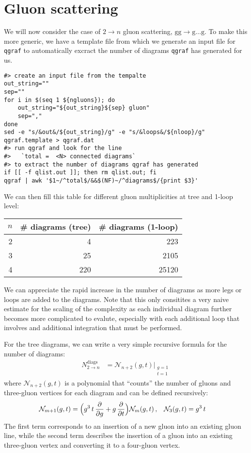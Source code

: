 \documentclass[11pt]{article}
\begin{document}
\section{Gluon scattering}
\label{sec:orga2452a0}
We will now consider the case of \(2\to n\) gluon scattering, \(\mathrm{g}\mathrm{g} \to \mathrm{g}\ldots\mathrm{g}\).
To make this more generic, we have a template file from which we generate an input file for \texttt{qgraf} to automatically excract the number of diagrams \texttt{qgraf} has generated for us.
\begin{verbatim}
#> create an input file from the tempalte
out_string=""
sep=""
for i in $(seq 1 ${ngluons}); do
    out_string="${out_string}${sep} gluon"
    sep=","
done
sed -e "s/&out&/${out_string}/g" -e "s/&loops&/${nloop}/g" qgraf.template > qgraf.dat
#> run qgraf and look for the line
#>   `total =  <N> connected diagrams`
#> to extract the number of diagrams qgraf has generated
if [[ -f qlist.out ]]; then rm qlist.out; fi
qgraf | awk '$1~/^total$/&&$(NF)~/^diagrams$/{print $3}'
\end{verbatim}
We can then fill this table for different gluon multiplicities at tree and 1-loop level:
\begin{center}
\begin{tabular}{rrr}
\(n\) & \# diagrams (tree) & \# diagrams (1-loop)\\
\hline
2 & 4 & 223\\
3 & 25 & 2105\\
4 & 220 & 25120\\
\end{tabular}
\end{center}
We can appreciate the rapid increase in the number of diagrams as more legs or loops are added to the diagrams.
Note that this only consitites a very naive estimate for the scaling of the complexity as each individual diagram further becomes more complicated to evalute, especially with each additional loop that involves and additional integration that must be performed.

For the tree diagrams, we can write a very simple recursive formula for the number of diagrams:
\begin{align}
  N_{2\to n}^\text{diags}
  &=
  \mathcal{N}_{n+2}(g,t) \bigr\rvert_{\substack{g=1\\t=1}}
\end{align}
where \(\mathcal{N}_{n+2}(g,t)\) is a polynomial that ``counts'' the number of gluons and three-gluon vertices for each diagram and can be defined recursively:
\begin{align}
  \mathcal{N}_{m+1}(g,t)
  &= \Bigl(g^3\,t\,\frac{\partial}{\partial g}
         + g\,\frac{\partial}{\partial t} \Bigr)
  \mathcal{N}_{m}(g,t) \,, &
  \mathcal{N}_{3}(g,t) &= g^3\,t
\end{align}
The first term corresponds to an insertion of a new gluon into an existing gluon line, while the second term describes the insertion of a gluon into an existing three-gluon vertex and converting it to a four-gluon vertex.
\end{document}
